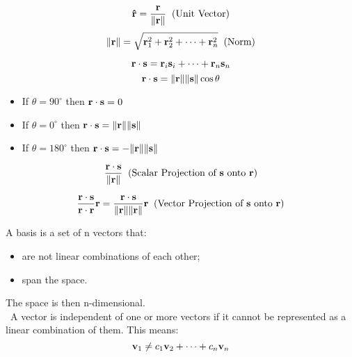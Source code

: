 \documentclass[10pt,a4paper]{Template}
\begin{document}
\thispagestyle{empty}


\begin{minipage}{0.48\textwidth}


\vspace{-5mm}
\[ \vu*\rvec = \frac{\rvec}{\norm{\rvec}} \;\; \text{(Unit Vector)}\]
\[ \norm{\mathbf{r}} = \sqrt{\mathbf{r}^2_1 + \mathbf{r}^2_2 + \cdots + \mathbf{r}^2_n} \;\; \text{(Norm)} \]
\divider

\vspace{-5mm}
\[ \mathbf{r} \cdot \mathbf{s} = \mathbf{r}_{i} \mathbf{s}_{i} + \dots + \mathbf{r}_{n} \mathbf{s}_{n} \]
\[ \mathbf{r} \cdot \mathbf{s} = \norm{\mathbf{r}} \norm{\mathbf{s}} \cos{\theta} \]
\begin{itemize}
	\item If $\theta = 90^{\circ}$ then $\mathbf{r} \cdot \mathbf{s} = 0 $
	\item If $\theta = 0^{\circ}$ then $\mathbf{r} \cdot \mathbf{s} = \norm{\mathbf{r}} \norm{\mathbf{s}} $
	\item If $\theta = 180^{\circ}$ then $\mathbf{r} \cdot \mathbf{s} = - \norm{\mathbf{r}} \norm{\mathbf{s}} $
\end{itemize}
\divider

\[ \frac{\mathbf{r} \cdot \mathbf{s}}{\norm{\mathbf{r}}} \;\; \text{(Scalar Projection of $\mathbf{s}$ onto $\mathbf{r}$)}\]

\[ \frac{\mathbf{r} \cdot \mathbf{s}}{\mathbf{r} \cdot \mathbf{r}} \mathbf{r} = \frac{\mathbf{r} \cdot \mathbf{s}}{\norm{\mathbf{r}} \norm{\mathbf{r}}} \mathbf{r} \;\; \text{(Vector Projection of $\mathbf{s}$ onto $\mathbf{r}$)}\]
\divider

\vspace{0.15cm}
A basis is a set of n vectors that:
\begin{itemize}[topsep=2.5pt]
	\item are not linear combinations of each other;
	\item span the space.
\end{itemize}
The space is then n-dimensional. \\

{\small \faLightbulb} \ A vector is independent of one or more vectors if it cannot be represented as a linear combination of them. This means:
\[ \mathbf{v}_1 \not = c_1 \mathbf{v}_{2} + \dots + c_n \mathbf{v}_{n} \]

\vspace{0.5cm}


\end{minipage}
\end{document}
